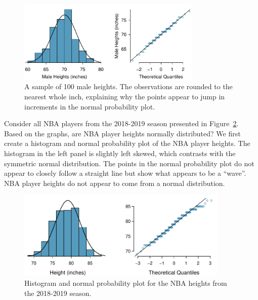 \begin{figure}[ht]
\centering
\includegraphics[width=0.78\textwidth]{ch_distributions/figures/fcidMHeights/fcidMHeights}
\caption{A sample of 100 male heights. The observations are rounded to the nearest whole inch, explaining why the points appear to jump in increments in the normal probability plot.}
\label{fcidMHeights}
\end{figure}


\begin{examplewrap}
\begin{nexample}{Consider all NBA players from the 2018-2019 season presented in Figure~\ref{nbaNormal}.\footnotemark\,  Based on the graphs, are NBA player heights normally distributed? }
We first create a histogram and normal probability plot of the NBA player heights. The histogram in the left panel is slightly left skewed, which contrasts with the symmetric normal distribution. The points in the normal probability plot do not appear to closely follow a straight line but show what appears to be a ``wave''. NBA player heights do not appear to come from a normal distribution.
\end{nexample}
\end{examplewrap}

\begin{figure}
\centering
\includegraphics[width=0.9\textwidth]{ch_distributions/figures/nbaNormal/nbaNormal}
\caption{Histogram and normal probability plot for the NBA heights from the 2018-2019 season.}
\label{nbaNormal}
\end{figure}


